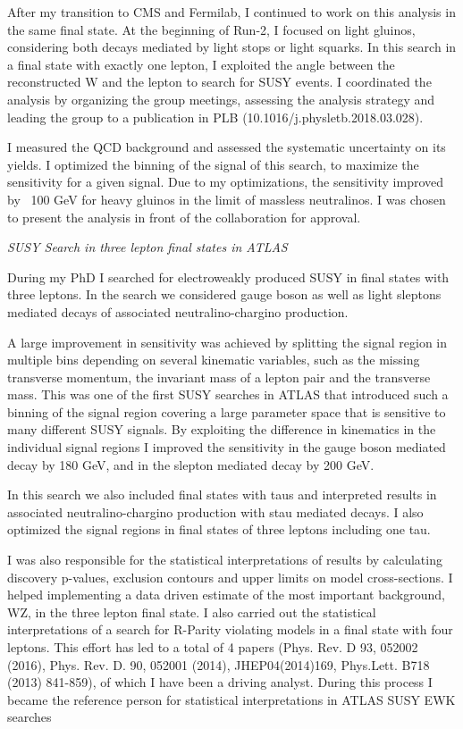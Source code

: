 \documentclass[]{cv} %
\begin{document}
\begin{statement}
After my transition to CMS and Fermilab, I continued to work on this analysis in
the same final state. At the beginning of Run-2, I focused on light gluinos,
considering both decays mediated by light stops or light squarks. In this search
in a final state with exactly one lepton, I exploited the angle between the
reconstructed W and the lepton to search for SUSY events. I coordinated the
analysis by organizing the group meetings, assessing the analysis strategy and
leading the group to a publication in PLB (10.1016/j.physletb.2018.03.028).

I measured the QCD background and assessed the systematic uncertainty on its
yields. I optimized the binning of the signal of this search, to maximize the
sensitivity for a given signal. Due to my optimizations, the sensitivity
improved by ~100 GeV for heavy gluinos in the limit of massless neutralinos. I
was chosen to present the analysis in front of the collaboration for approval.

\vspace{15pt}
\Large{}
\textit{SUSY Search in three lepton final states in ATLAS}
\normalsize{}

During my PhD I searched for electroweakly produced SUSY in final states with
three leptons. In the search we considered gauge boson as well as light sleptons
mediated decays of associated neutralino-chargino production.

A large improvement in sensitivity was achieved by splitting the signal region
in multiple bins depending on several kinematic variables, such as the missing
transverse momentum, the invariant mass of a lepton pair and the transverse
mass. This was one of the first SUSY searches in ATLAS that introduced such a
binning of the signal region covering a large parameter space that is sensitive
to many different SUSY signals. By exploiting the difference in kinematics in
the individual signal regions I improved the sensitivity in the gauge boson
mediated decay by 180 GeV, and in the slepton mediated decay by 200 GeV.

In this search we also included final states with taus and interpreted results
in associated neutralino-chargino production with stau mediated decays. I also
optimized the signal regions in final states of three leptons including one tau.

I was also responsible for the statistical interpretations of results by
calculating discovery p-values, exclusion contours and upper limits on model
cross-sections. I helped implementing a data driven estimate of the most
important background, WZ, in the three lepton final state. I also carried out
the statistical interpretations of a search for R-Parity violating models in a
final state with four leptons. This effort has led to a total of 4 papers (Phys.
Rev. D 93, 052002 (2016), Phys. Rev. D. 90, 052001 (2014), JHEP04(2014)169,
Phys.Lett. B718 (2013) 841-859), of which I have been a driving analyst. During
this process I became the reference person for statistical interpretations in
ATLAS SUSY EWK searches


\end{statement}
\end{document}
